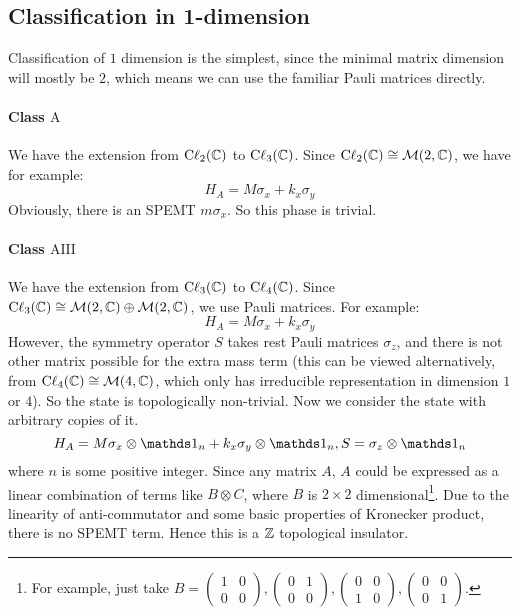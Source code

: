 \documentclass{article}
\begin{document}
\subsection{Classification in 1-dimension}
\label{sec:Classification in 1-dimension}
Classification of $1$ dimension is the simplest, since the minimal matrix
dimension will mostly be $2$, which means we can use the familiar Pauli matrices
directly.

\paragraph{Class $\mathrm{A}$} We have the extension from
$\mathrm{C\ell}_{2}(\mathbb{C})$ to $\mathrm{C\ell}_{3}(\mathbb{C})$. Since
$\mathrm{C\ell}_{2}(\mathbb{C})\cong\mathcal{M}(2,\mathbb{C})$, we have for example:
\begin{equation}
    H_A = M \sigma_x + k_x \sigma_y
\end{equation}
Obviously, there is an SPEMT $m\sigma_x$. So this phase is trivial.

\paragraph{Class $\mathrm{AIII}$} We have the extension from
$\mathrm{C\ell}_{3}(\mathbb{C})$ to $\mathrm{C\ell}_{4}(\mathbb{C})$. Since
$\mathrm{C\ell}_{3}(\mathbb{C})\cong \mathcal{M}(2,\mathbb{C})\oplus\mathcal{M}(2,\mathbb{C})$, we use
Pauli matrices. For example:
\begin{equation}
    H_A = M \sigma_x + k_x \sigma_y
\end{equation}
However, the symmetry operator $S$ takes rest Pauli matrices $\sigma_z$, and
there is not other matrix possible for the extra mass term (this can be viewed
alternatively, from $\mathrm{C\ell}_{4}(\mathbb{C})\cong \mathcal{M}(4,\mathbb{C})$, which only
has irreducible representation in dimension $1$ or $4$). So the state is
topologically non-trivial. Now we consider the state with arbitrary copies of it.
\begin{equation}
    H_A = M \sigma_x\otimes \id_n + k_x\sigma_y\otimes\id_n,
    S=\sigma_z\otimes\id_n
\end{equation}
where $n$ is some positive integer. Since any matrix $A$, $A$ could be expressed
as a linear combination of terms like $B\otimes C$, where $B$ is $2\times 2$
dimensional\footnote{For example, just take $B= \begin{pmatrix}1 & 0 \\ 0 &
0\end{pmatrix},\begin{pmatrix}0 & 1 \\ 0 & 0\end{pmatrix},\begin{pmatrix}0 & 0
\\ 1 & 0\end{pmatrix},\begin{pmatrix}0 & 0 \\ 0 & 1\end{pmatrix}$.}. Due to the
linearity of anti-commutator and some basic properties of Kronecker product,
there is no SPEMT term. Hence this is a $\mathbb{Z}$ topological insulator.
\end{document}
